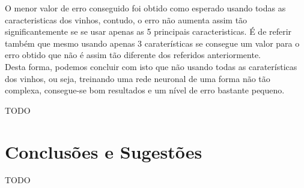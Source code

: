 \documentclass{article}
\begin{document}
O menor valor de erro conseguido foi obtido como esperado usando todas as caracteristicas dos vinhos, contudo, o erro não aumenta assim tão significantemente se se usar apenas as 5 principais caracteristicas. É de referir também que mesmo usando apenas 3 caraterísticas se consegue um valor para o erro obtido que não é assim tão diferente dos referidos anteriormente.\\
Desta forma, podemos concluir com isto que não usando todas as caraterísticas dos vinhos, ou seja, treinando uma rede neuronal de uma forma não tão complexa, consegue-se bom resultados e um nível de erro bastante pequeno.

{\color{red}TODO}

\newpage

\vspace*{\fill}
\section{Conclusões e Sugestões}
{\color{red}TODO}
\vspace*{\fill}

\newpage
\end{document}
